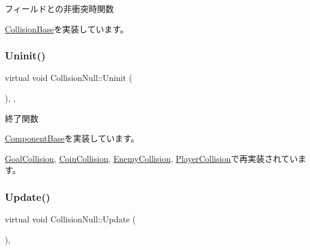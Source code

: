 フィールドとの非衝突時関数 



\mbox{\hyperlink{class_collision_base_ac1ed5b1c0c9b6b70b432e6656f9c4b45}{Collision\+Base}}を実装しています。

\mbox{\label{class_collision_null_a7c6d0ec502efc55e2f406415451152f5}} 
\subsubsection{\texorpdfstring{Uninit()}{Uninit()}}
{\footnotesize\ttfamily virtual void Collision\+Null\+::\+Uninit (\begin{DoxyParamCaption}{ }\end{DoxyParamCaption})\hspace{0.3cm}{\ttfamily [inline]}, {\ttfamily [override]}, {\ttfamily [virtual]}}



終了関数 



\mbox{\hyperlink{class_component_base_a9f42beaf0383d6f629819579cab4de57}{Component\+Base}}を実装しています。



\mbox{\hyperlink{class_goal_collision_ab818bad44ffcd595f1c495e659c0b348}{Goal\+Collision}}, \mbox{\hyperlink{class_coin_collision_aa852afdcdbedcf82809df9c7fd99be9e}{Coin\+Collision}}, \mbox{\hyperlink{class_enemy_collision_a2a194c606fd162db803c70c6fed9b9e4}{Enemy\+Collision}}, \mbox{\hyperlink{class_player_collision_aa1ab60a62fa2ae3231a1ea0bc8faf801}{Player\+Collision}}で再実装されています。

\mbox{\label{class_collision_null_a5e5e094e3fbe3ccc0515e485c739bd15}} 
\subsubsection{\texorpdfstring{Update()}{Update()}}
{\footnotesize\ttfamily virtual void Collision\+Null\+::\+Update (\begin{DoxyParamCaption}{ }\end{DoxyParamCaption})\hspace{0.3cm}{\ttfamily [inline]}, {\ttfamily [virtual]}}



